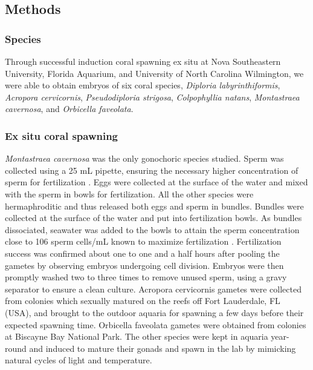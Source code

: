 \documentclass[preprint,12pt,authoryear]{elsarticle}
\begin{document}
	\subsection{Methods}
	\subsubsection{Species}

	Through successful induction coral spawning ex situ at Nova Southeastern University, Florida Aquarium, and University of North Carolina Wilmington, we were able to obtain embryos of six coral species, \textit{Diploria labyrinthiformis}, \textit{Acropora cervicornis}, \textit{Pseudodiploria strigosa}, \textit{Colpophyllia natans}, \textit{Montastraea cavernosa}, and \textit{Orbicella faveolata}. 

	\subsubsection{Ex situ coral spawning}
	\textit{Montastraea cavernosa} was the only gonochoric species studied. Sperm was collected using a 25 mL pipette, ensuring the necessary higher concentration of sperm for fertilization \citep{fogarty2012weak, fogarty2012asymmetric, dela2020optimising}. Eggs were collected at the surface of the water and mixed with the sperm in bowls for fertilization. All the other species were hermaphroditic and thus released both eggs and sperm in bundles. Bundles were collected at the surface of the water and put into fertilization bowls. As bundles dissociated, seawater was added to the bowls to attain the sperm concentration close to 106 sperm cells/mL known to maximize fertilization \citep{fogarty2012weak, fogarty2012asymmetric, dela2020optimising}. Fertilization success was confirmed about one to one and a half hours after pooling the gametes by observing embryos undergoing cell division. Embryos were then promptly washed two to three times to remove unused sperm, using a gravy separator to ensure a clean culture. Acropora cervicornis gametes were collected from colonies which sexually matured on the reefs off Fort Lauderdale, FL (USA), and brought to the outdoor aquaria for spawning a few days before their expected spawning time. Orbicella faveolata gametes were obtained from colonies at Biscayne Bay National Park. The other species were kept in aquaria year-round and induced to mature their gonads and spawn in the lab by mimicking natural cycles of light and temperature.
\end{document}
